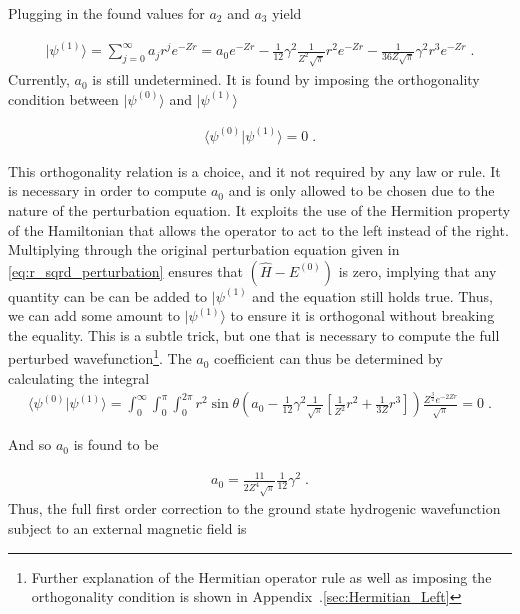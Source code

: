         \noindent Plugging in the found values for $a_2$ and $a_3$ yield 

        \begin{align}
            \vert \psi^{(1)} \rangle = \sum_{j = 0}^\infty a_j r^j e^{-Zr} = a_0 e^{-Zr} -\frac{1}{12} \gamma^2 \frac{1}{Z^2 \sqrt{\pi}} r^2 e^{-Zr} -\frac{1}{36Z\sqrt{\pi}} \gamma^2 r^3 e^{-Zr}\;.
        \end{align}
        Currently, $a_0$ is still undetermined. It is found by imposing the orthogonality condition between $\vert \psi^{(0)} \rangle$ and $\vert \psi^{(1)} \rangle$

        \begin{align}
            \langle \psi^{(0)} \vert \psi^{(1)} \rangle = 0\;.
        \end{align}

        This orthogonality relation is a choice, and it not required by any law or rule. It is necessary in order to compute $a_0$ and is only allowed to be chosen due to the nature of the perturbation equation. It exploits the use of the Hermition property of the Hamiltonian that allows the operator to act to the left instead of the right. Multiplying through the original perturbation equation given in \eqref{eq:r_sqrd_perturbation} ensures that $\left(\hat{H} - E^{(0)} \right)$ is zero, implying that any quantity can be can be added to $\vert \psi^{(1)}$ and the equation still holds true. Thus, we can add some amount to $\vert \psi^{(1)} \rangle$ to ensure it is orthogonal without breaking the equality. This is a subtle trick, but one that is necessary to compute the full perturbed wavefunction\footnote{Further explanation of the Hermitian operator rule as well as imposing the orthogonality condition is shown in Appendix~.\ref{sec:Hermitian_Left}}. The $a_0$ coefficient can thus be determined by calculating the integral 
        \small
        \begin{align}
            \langle \psi^{(0)} \vert \psi^{(1)} \rangle = \int_0^\infty \int_0^\pi \int_0^{2\pi} r^2 \sin \theta \left(a_0 -\frac{1}{12} \gamma^2 \frac{1}{\sqrt{\pi}} \left[\frac{1}{Z^2} r^2 +\frac{1}{3Z} r^3\right] \right) \frac{Z^{\frac{3}{2}} e^{-2Zr}}{\sqrt{\pi}} = 0\;.
        \end{align}
        \normalsize

        \noindent And so $a_0$ is found to be 

        \begin{align}
            a_0 = \frac{11}{2 Z^4 \sqrt{\pi}} \frac{1}{12}\gamma^2 \;.
        \end{align}
        \noindent Thus, the full first order correction to the ground state hydrogenic wavefunction subject to an external magnetic field is 

